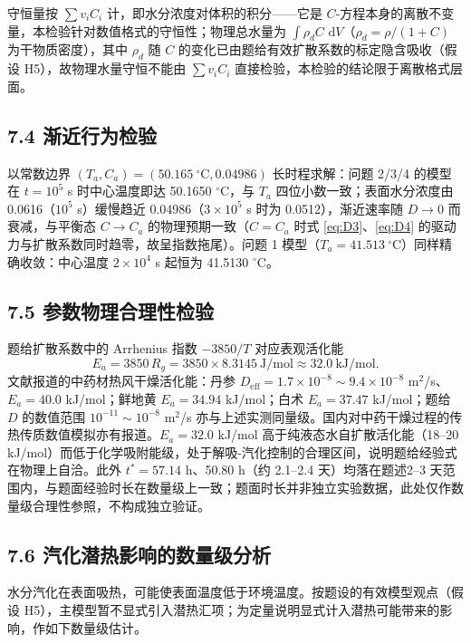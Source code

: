 \documentclass[12pt,a4paper]{ctexart}
\newcommand{\dd}{\,\mathrm{d}}
\begin{document}
守恒量按 $\sum v_iC_i$ 计，即水分浓度对体积的积分——它是 $C$-方程本身的离散不变量，本检验针对数值格式的守恒性；物理总水量为 $\int\rho_d C\,\dd V$（$\rho_d=\rho/(1+C)$ 为干物质密度），其中 $\rho_d$ 随 $C$ 的变化已由题给有效扩散系数的标定隐含吸收（假设 H5），故物理水量守恒不能由 $\sum v_iC_i$ 直接检验，本检验的结论限于离散格式层面。

\subsection{7.4 渐近行为检验}

以常数边界 $(T_a,C_a)=(50.165\ ^\circ\mathrm{C},0.04986)$ 长时程求解：问题 2/3/4 的模型在 $t=10^5$ s 时中心温度即达 50.1650 $^\circ$C，与 $T_a$ 四位小数一致；表面水分浓度由 0.0616（$10^5$ s）缓慢趋近 0.04986（$3\times10^5$ s 时为 0.0512），渐近速率随 $D\to0$ 而衰减，与平衡态 $C\to C_a$ 的物理预期一致（$C=C_a$ 时式 \eqref{eq:D3}、\eqref{eq:D4} 的驱动力与扩散系数同时趋零，故呈指数拖尾）。问题 1 模型（$T_a=41.513\ ^\circ$C）同样精确收敛：中心温度 $2\times10^4$ s 起恒为 41.5130 $^\circ$C。

\subsection{7.5 参数物理合理性检验}

题给扩散系数中的 Arrhenius 指数 $-3850/T$ 对应表观活化能
\begin{equation}
E_a=3850\,R_g=3850\times8.3145\ \mathrm{J/mol}\approx32.0\ \mathrm{kJ/mol}.
\end{equation}
文献报道的中药材热风干燥活化能：丹参 $D_{\mathrm{eff}}=1.7\times10^{-8}\sim9.4\times10^{-8}$ m$^2$/s、$E_a=40.0$ kJ/mol\cite{danshen}；鲜地黄 $E_a=34.94$ kJ/mol\cite{dihuang}；白术 $E_a=37.47$ kJ/mol\cite{baizhu}；题给 $D$ 的数值范围 $10^{-11}\sim10^{-8}$ m$^2$/s 亦与上述实测同量级。国内对中药干燥过程的传热传质数值模拟亦有报道\cite{wang}。$E_a=32.0$ kJ/mol 高于纯液态水自扩散活化能（18--20 kJ/mol\cite{mills}）而低于化学吸附能级，处于解吸-汽化控制的合理区间，说明题给经验式在物理上自洽。此外 $t^*=57.14$ h、50.80 h（约 2.1--2.4 天）均落在题述2--3 天范围内，与题面经验时长在数量级上一致；题面时长并非独立实验数据，此处仅作数量级合理性参照，不构成独立验证。

\subsection{7.6 汽化潜热影响的数量级分析}

水分汽化在表面吸热，可能使表面温度低于环境温度。按题设的有效模型观点（假设 H5），主模型暂不显式引入潜热汇项；为定量说明显式计入潜热可能带来的影响，作如下数量级估计。
\end{document}
